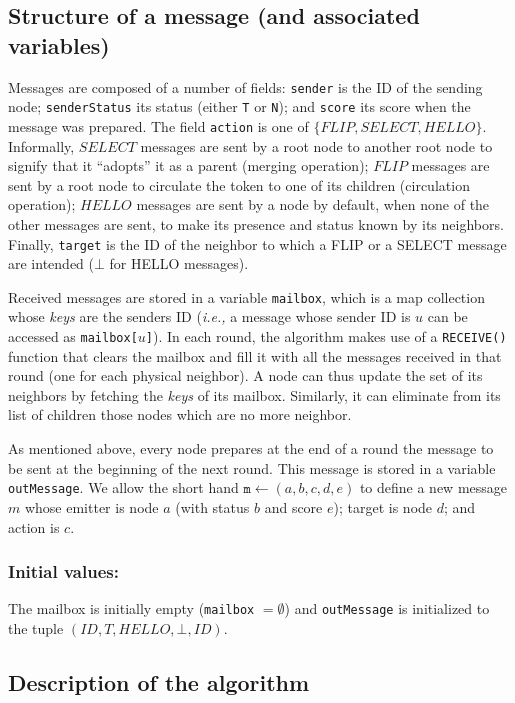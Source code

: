 \documentclass[twocolumn]{article}
\begin{document}
\subsection{Structure of a message (and associated variables)}

Messages are composed of a number of fields: {\tt sender} is the ID of
the sending node; {\tt senderStatus} its status (either {\tt T} or
{\tt N}); and {\tt score} its score when the message was prepared. The
field {\tt action} is one of $\{FLIP,SELECT,HELLO\}$. Informally,
$SELECT$ messages are sent by a root node to another root node to
signify that it ``adopts'' it as a parent (merging operation); $FLIP$
messages are sent by a root node to circulate the token to one of its
children (circulation operation); $HELLO$ messages are sent by a node
by default, when none of the other messages are sent, to make its
presence and status known by its neighbors. Finally, {\tt target} is
the ID of the neighbor to which a FLIP or a SELECT message are
intended ($\bot$ for HELLO messages).

Received messages are stored in a variable \texttt{mailbox}, which is
a map collection whose {\em keys} are the senders ID ({\it i.e.,} a
message whose sender ID is $u$ can be accessed as {\tt mailbox[$u$]}).
In each round, the algorithm makes use of a {\tt RECEIVE()} function
that clears the mailbox and fill it with all the messages received in
that round (one for each physical neighbor). A node can thus update
the set of its neighbors by fetching the {\em keys} of its mailbox.
Similarly, it can eliminate from its list of children those nodes which
are no more neighbor.

As mentioned above, every node prepares at the end of a round the message to
be sent at the beginning of the next round. This message is stored in
a variable \texttt{outMessage}. We allow the short hand $\texttt{m} \gets (a, b, c, d, e)$ to define a new message $m$ whose emitter is node $a$ (with status $b$ and score $e$); target is node $d$; and action is $c$.


\subsubsection{Initial values:} The mailbox is initially empty ({\tt mailbox} $=\emptyset$) and \texttt{outMessage} is initialized to the tuple $(ID, T, HELLO, \bot, ID)$.

\subsection{Description of the algorithm}
\end{document}
